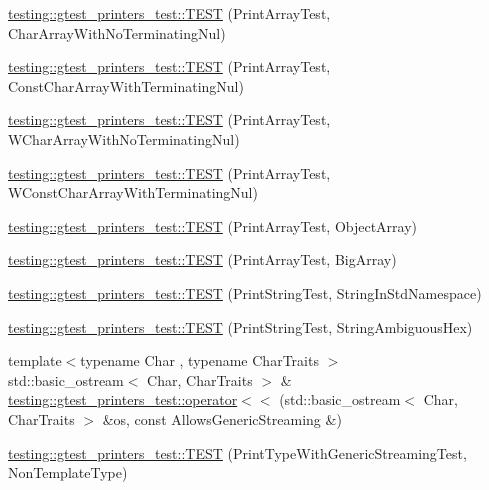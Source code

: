 \begin{DoxyCompactItemize}
\item 
\mbox{\hyperlink{namespacetesting_1_1gtest__printers__test_a3bae023a42049745b49fa1f2db9a0cb2}{testing\+::gtest\+\_\+printers\+\_\+test\+::\+T\+E\+ST}} (Print\+Array\+Test, Char\+Array\+With\+No\+Terminating\+Nul)
\item 
\mbox{\hyperlink{namespacetesting_1_1gtest__printers__test_ab51b9ecaca7d635326101b23d5e8afd2}{testing\+::gtest\+\_\+printers\+\_\+test\+::\+T\+E\+ST}} (Print\+Array\+Test, Const\+Char\+Array\+With\+Terminating\+Nul)
\item 
\mbox{\hyperlink{namespacetesting_1_1gtest__printers__test_ac19ec2732031bfe83b30ea9f00259ef3}{testing\+::gtest\+\_\+printers\+\_\+test\+::\+T\+E\+ST}} (Print\+Array\+Test, W\+Char\+Array\+With\+No\+Terminating\+Nul)
\item 
\mbox{\hyperlink{namespacetesting_1_1gtest__printers__test_a6a7cbcdbe748a1d4e90658f48f36c9da}{testing\+::gtest\+\_\+printers\+\_\+test\+::\+T\+E\+ST}} (Print\+Array\+Test, W\+Const\+Char\+Array\+With\+Terminating\+Nul)
\item 
\mbox{\hyperlink{namespacetesting_1_1gtest__printers__test_af91d8ad9d6c7547913fe05c7acc44114}{testing\+::gtest\+\_\+printers\+\_\+test\+::\+T\+E\+ST}} (Print\+Array\+Test, Object\+Array)
\item 
\mbox{\hyperlink{namespacetesting_1_1gtest__printers__test_a596493b56489aa1571fa26d1402e7116}{testing\+::gtest\+\_\+printers\+\_\+test\+::\+T\+E\+ST}} (Print\+Array\+Test, Big\+Array)
\item 
\mbox{\hyperlink{namespacetesting_1_1gtest__printers__test_abbd355e76033f0defd76c37523ad0f60}{testing\+::gtest\+\_\+printers\+\_\+test\+::\+T\+E\+ST}} (Print\+String\+Test, String\+In\+Std\+Namespace)
\item 
\mbox{\hyperlink{namespacetesting_1_1gtest__printers__test_ac20ee165500471e363011c3f664d2fb8}{testing\+::gtest\+\_\+printers\+\_\+test\+::\+T\+E\+ST}} (Print\+String\+Test, String\+Ambiguous\+Hex)
\item 
{\footnotesize template$<$typename Char , typename Char\+Traits $>$ }\\std\+::basic\+\_\+ostream$<$ Char, Char\+Traits $>$ \& \mbox{\hyperlink{namespacetesting_1_1gtest__printers__test_a1eb0213095e639d357692066e8505887}{testing\+::gtest\+\_\+printers\+\_\+test\+::operator$<$$<$}} (std\+::basic\+\_\+ostream$<$ Char, Char\+Traits $>$ \&os, const Allows\+Generic\+Streaming \&)
\item 
\mbox{\hyperlink{namespacetesting_1_1gtest__printers__test_a9272037c799c4779e1d79476dad66cb6}{testing\+::gtest\+\_\+printers\+\_\+test\+::\+T\+E\+ST}} (Print\+Type\+With\+Generic\+Streaming\+Test, Non\+Template\+Type)

\end{DoxyCompactItemize}
